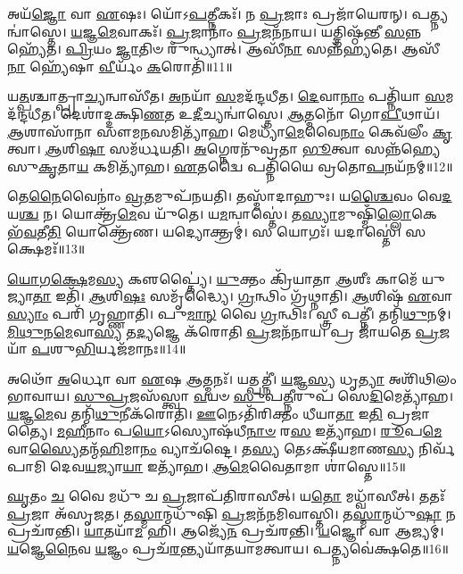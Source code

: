 𑌅𑌯᳴\-\ul{𑌜𑍍𑌞𑍋} 𑌵𑌾 \ul{𑌏}\-𑌷𑌃।
𑌯𑍋᳴𑌽\-\ul{𑌪}\-𑌤𑍍𑌨𑍀𑌕𑌃᳴।
𑌨 \ul{𑌪𑍍𑌰}\-𑌜𑌾𑌃 𑌪𑍍𑌰𑌜𑌾᳴𑌯𑍇𑌰𑌨𑍍।
𑌪𑌤𑍍𑌨𑍍𑌯𑌨𑍍𑌵𑌾॑𑌸𑍍𑌤𑍇।
\-\ul{𑌯}\-𑌜𑍍𑌞\-\ul{𑌮𑍇}\-𑌵𑌾𑌕𑌃᳴।
\-\ul{𑌪𑍍𑌰}\-𑌜𑌾𑌨𑌾𑌂॑ \ul{𑌪𑍍𑌰}\-𑌜𑌨᳴𑌨𑌾𑌯।
𑌯𑌤𑍍𑌤𑌿𑌷𑍍𑌠᳴𑌨𑍍𑌤𑍀 \ul{𑌸}\-𑌨𑍍𑌨𑌹𑍍𑌯𑍇᳴𑌤।
\-\ul{𑌪𑍍𑌰𑌿}\-𑌯𑌂 \ul{𑌜𑍍𑌞𑌾}\-𑌤𑌿𑍞 𑌰𑍁᳴𑌨𑍍𑌧𑍍𑌯𑌾𑌤𑍍।
𑌆𑌸𑍀᳴\-\ul{𑌨𑌾} 𑌸𑌨𑍍𑌨᳴𑌹𑍍𑌯𑌤𑍇।
𑌆𑌸𑍀᳴\-\ul{𑌨𑌾} 𑌹𑍍𑌯𑍇᳴𑌷𑌾 \ul{𑌵𑍀}\-𑌰𑍍𑌯𑌂᳴ \ul{𑌕}\-𑌰𑍋𑌤𑌿᳴॥11॥

𑌯\-\ul{𑌤𑍍𑌪}\-𑌶𑍍𑌚𑌾𑌤𑍍𑌪𑍍𑌰𑌾\-\ul{𑌚𑍍𑌯}\-𑌨𑍍𑌵𑌾𑌸𑍀᳴𑌤।
\-\ul{𑌅}\-𑌨𑌯𑌾᳴ \ul{𑌸}\-𑌮𑌦᳴𑌨𑍍𑌦𑌧𑍀𑌤।
\-\ul{𑌦𑍇}\-𑌵𑌾\-\ul{𑌨𑌾𑌂} 𑌪𑌤𑍍𑌨𑌿᳴𑌯𑌾 \ul{𑌸}\-𑌮𑌦᳴𑌨𑍍𑌦𑌧𑍀𑌤।
𑌦𑍇𑌶𑌾॑𑌦𑍍𑌦𑌕𑍍𑌷𑌿\-\ul{𑌣}\-𑌤 𑌉\-\ul{𑌦𑍀}\-𑌚𑍍𑌯𑌨𑍍𑌵𑌾॑𑌸𑍍𑌤𑍇।
\-\ul{𑌆}\-𑌤𑍍𑌮𑌨𑍋᳴ 𑌗𑍋\-\ul{𑌪𑍀}\-𑌥𑌾𑌯᳴।
\-\ul{𑌆}\-𑌶𑌾𑌸𑌾᳴𑌨𑌾 𑌸𑍗𑌮\-\ul{𑌨}\-𑌸𑌮𑌿𑌤𑍍𑌯𑌾᳴𑌹।
𑌮𑍇𑌧𑍍𑌯𑌾᳴\-\ul{𑌮𑍇}\-𑌵𑍈\-\ul{𑌨𑌾𑌂} 𑌕𑍇𑌵᳴𑌲𑍀𑌂 \ul{𑌕𑍃}\-𑌤𑍍𑌵𑌾।
\-\ul{𑌆}\-𑌶𑌿\-\ul{𑌷𑌾} 𑌸𑌮᳴𑌰𑍍𑌧𑌯𑌤𑌿।
\-\ul{𑌅}\-𑌗𑍍𑌨𑍇𑌰𑌨𑍁᳴\-𑌵𑍍𑌰𑌤𑌾 \ul{𑌭𑍂}\-𑌤𑍍𑌵𑌾 𑌸𑌨𑍍𑌨᳴𑌹𑍍𑌯𑍇 𑌸𑍁\-\ul{𑌕𑍃}\-𑌤𑌾\-\ul{𑌯} 𑌕𑌮𑌿𑌤𑍍𑌯𑌾᳴𑌹।
\-\ul{𑌏}\-𑌤𑌦𑍍𑌵𑍈 𑌪𑌤𑍍𑌨𑌿᳴𑌯𑍈 𑌵𑍍𑌰𑌤𑍋\-\ul{𑌪}\-𑌨𑌯᳴𑌨𑌮𑍍॥12॥

𑌤𑍇\-\ul{𑌨𑍈}\-𑌵𑍈𑌨𑌾𑌂॑ \ul{𑌵𑍍𑌰}\-𑌤𑌮𑍁𑌪᳴𑌨𑌯𑌤𑌿।
𑌤𑌸𑍍𑌮𑌾᳴𑌦𑌾𑌹𑍁𑌃।
𑌯\-\ul{𑌶𑍍𑌚𑍈}\-𑌵𑌂 𑌵𑍇\-\ul{𑌦} 𑌯\-\ul{𑌶𑍍𑌚} 𑌨।
𑌯𑍋𑌕𑍍𑌤𑍍𑌰᳴\-\ul{𑌮𑍇}\-𑌵 𑌯𑍁᳴𑌤𑍇।
𑌯\-\ul{𑌮}\-𑌨𑍍𑌵𑌾𑌸𑍍𑌤𑍇॑।
𑌤\-\ul{𑌸𑍍𑌯𑌾}\-𑌮𑍁𑌷𑍍𑌮𑌿𑌁᳴\-\ul{𑌲𑍍𑌲𑍋}\-𑌕𑍇 𑌭᳴\-\ul{𑌵}\-𑌤𑍀\-\ul{𑌤𑌿} 𑌯𑍋𑌕𑍍𑌤𑍍𑌰𑍇᳴𑌣।
𑌯𑌦𑍍𑌯𑍋𑌕𑍍𑌤𑍍𑌰𑌮𑍍॑।
𑌸 𑌯𑍋𑌗𑌃᳴।
𑌯𑌦𑌾𑌸𑍍𑌤𑍇॑।
𑌸 𑌕𑍍𑌷𑍇𑌮𑌃᳴॥13॥

\-\ul{𑌯𑍋}\-\-\ul{𑌗}\-\-\ul{𑌕𑍍𑌷𑍇}\-𑌮\-\ul{𑌸𑍍𑌯} 𑌕𑍢𑌪𑍍𑌤𑍍𑌯𑍈॑।
\-\ul{𑌯𑍁}\-𑌕𑍍𑌤𑌂 𑌕𑍍𑌰𑌿᳴𑌯𑌾𑌤𑌾 \ul{𑌆}\-𑌶𑍀𑌃 𑌕𑌾𑌮𑍇᳴ 𑌯𑍁𑌜𑍍𑌯𑌾\-\ul{𑌤𑌾} 𑌇𑌤𑌿᳴।
\-\ul{𑌆}\-𑌶𑌿\-\ul{𑌷𑌃} 𑌸𑌮𑍃᳴𑌦𑍍𑌧𑍍𑌯𑍈।
\-\ul{𑌗𑍍𑌰}\-𑌨𑍍𑌥𑌿𑌂 𑌗𑍍𑌰᳴𑌥𑍍𑌨𑌾𑌤𑌿।
\-\ul{𑌆}\-𑌶𑌿𑌷᳴ \ul{𑌏}\-𑌵𑌾\-\ul{𑌸𑍍𑌯𑌾𑌂} 𑌪𑌰𑌿᳴ 𑌗𑍃𑌹𑍍𑌣𑌾𑌤𑌿।
𑌪𑍁\-\ul{𑌮𑌾}\-\-\ul{𑌨𑍍} 𑌵𑍈 \ul{𑌗𑍍𑌰}\-𑌨𑍍𑌥𑌿𑌃।
𑌸𑍍𑌤𑍍𑌰𑍀 𑌪𑌤𑍍𑌨𑍀॑।
𑌤𑌨𑍍𑌮𑌿᳴\-\ul{𑌥𑍁}\-𑌨𑌮𑍍।
\-\ul{𑌮𑌿}\-\-\ul{𑌥𑍁}\-𑌨\-\ul{𑌮𑍇}\-𑌵𑌾\-\ul{𑌸𑍍𑌯} 𑌤\-\ul{𑌦𑍍𑌯}\-𑌜𑍍𑌞𑍇 𑌕᳴𑌰𑍋𑌤𑌿 \ul{𑌪𑍍𑌰}\-𑌜𑌨᳴𑌨𑌾𑌯।
𑌪𑍍𑌰 𑌜𑌾᳴𑌯𑌤𑍇 \ul{𑌪𑍍𑌰}\-𑌜𑌯𑌾᳴ \ul{𑌪}\-𑌶𑍁\-\ul{𑌭𑌿}\-𑌰𑍍𑌯𑌜᳴𑌮𑌾𑌨𑌃॥14॥

𑌅𑌥𑍋᳴ \ul{𑌅}\-𑌰𑍍𑌧𑍋 𑌵𑌾 \ul{𑌏}\-𑌷 \ul{𑌆}\-𑌤𑍍𑌮𑌨𑌃᳴।
𑌯𑌤𑍍𑌪𑌤𑍍𑌨𑍀॑।
\-\ul{𑌯}\-𑌜𑍍𑌞\-\ul{𑌸𑍍𑌯} 𑌧𑍃\-\ul{𑌤𑍍𑌯𑌾} 𑌅𑌶𑌿᳴𑌥𑌿𑌲𑌂 𑌭𑌾𑌵𑌾𑌯।
\-\ul{𑌸𑍁}\-\-\ul{𑌪𑍍𑌰}\-𑌜𑌸᳴𑌸𑍍𑌤𑍍𑌵𑌾 \ul{𑌵}\-𑌯𑍞 \ul{𑌸𑍁}\-𑌪\-\ul{𑌤𑍍𑌨𑍀}\-𑌰𑍁𑌪᳴ 𑌸𑍇\-\ul{𑌦𑌿}\-𑌮𑍇𑌤𑍍𑌯𑌾᳴𑌹।
\-\ul{𑌯}\-𑌜𑍍𑌞\-\ul{𑌮𑍇}\-𑌵 𑌤𑌨𑍍𑌮𑌿᳴\-\ul{𑌥𑍁}\-𑌨𑍀𑌕᳴𑌰𑍋𑌤𑌿।
\-\ul{𑌊}\-𑌨𑍇𑌽𑌤𑌿᳴𑌰𑌿𑌕𑍍𑌤𑌂 𑌧𑍀𑌯𑌾\-\ul{𑌤𑌾} 𑌇\-\ul{𑌤𑌿} 𑌪𑍍𑌰𑌜𑌾॑𑌤𑍍𑌯𑍈।
\-\ul{𑌮}\-\-\ul{𑌹𑍀}\-𑌨𑌾𑌂 𑌪\-\ul{𑌯𑍋}\-\-𑌽𑌸𑍍𑌯𑍋𑌷᳴𑌧𑍀\-\ul{𑌨𑌾}\-\-\ul{𑍞} 𑌰\-\ul{𑌸} 𑌇𑌤𑍍𑌯𑌾᳴𑌹।
\-\ul{𑌰𑍂}\-𑌪\-\ul{𑌮𑍇}\-𑌵𑌾\-\ul{𑌸𑍍𑌯𑍈}\-𑌤𑌨𑍍𑌮᳴\-\ul{𑌹𑌿}\-𑌮𑌾\-\ul{𑌨𑌂} 𑌵𑍍𑌯𑌾𑌚᳴𑌷𑍍𑌟𑍇।
𑌤\-\ul{𑌸𑍍𑌯} 𑌤𑍇𑌽𑌕𑍍𑌷𑍀᳴𑌯𑌮𑌾𑌣\-\ul{𑌸𑍍𑌯} 𑌨𑌿𑌰𑍍𑌵᳴𑌪𑌾𑌮𑌿 𑌦𑍇𑌵\-\ul{𑌯}\-𑌜𑍍𑌯𑌾\-\ul{𑌯𑌾} 𑌇𑌤𑍍𑌯𑌾᳴𑌹।
\-\ul{𑌆}\-\-\-\ul{𑌮𑍇}\-𑌵𑍈𑌤𑌾𑌮𑌾 𑌶𑌾॑𑌸𑍍𑌤𑍇॥15॥\anuvakamend[\-\ul{𑌕}\-𑌰𑍋𑌤𑌿᳴ 𑌵𑍍𑌰𑌤𑍋\-\ul{𑌪}\-𑌨𑌯᳴\-\ul{𑌨𑌂} 𑌕𑍍𑌷𑍇\-\ul{𑌮𑍋} 𑌯𑌜᳴𑌮𑌾𑌨𑌃 𑌶𑌾𑌸𑍍𑌤𑍇]

\-\ul{𑌘𑍃}\-𑌤𑌂 \ul{𑌚} 𑌵𑍈 𑌮𑌧𑍁᳴ 𑌚 \ul{𑌪𑍍𑌰}\-𑌜𑌾𑌪᳴𑌤𑌿𑌰𑌾𑌸𑍀𑌤𑍍।
𑌯\-\ul{𑌤𑍋} 𑌮𑌧𑍍𑌵𑌾᳴𑌸𑍀𑌤𑍍।
𑌤𑌤𑌃᳴ \ul{𑌪𑍍𑌰}\-𑌜𑌾 𑌅᳴\-𑌸𑍃𑌜𑌤।
𑌤\-\ul{𑌸𑍍𑌮𑌾}\-𑌨𑍍𑌮𑌧𑍁᳴𑌷𑌿 \ul{𑌪𑍍𑌰}\-𑌜𑌨᳴𑌨𑌮𑌿𑌵𑌾𑌸𑍍𑌤𑌿।
𑌤\-\ul{𑌸𑍍𑌮𑌾}\-𑌨𑍍𑌮𑌧𑍁᳴\-\ul{𑌷𑌾} 𑌨 𑌪𑍍𑌰𑌚᳴𑌰𑌨𑍍𑌤𑌿।
\-\ul{𑌯𑌾}\-𑌤𑌯𑌾᳴\-\ul{𑌮} 𑌹𑌿।
𑌆𑌜𑍍𑌯𑍇᳴\-\ul{𑌨} 𑌪𑍍𑌰𑌚᳴𑌰𑌨𑍍𑌤𑌿।
\-\ul{𑌯}\-𑌜𑍍𑌞𑍋 𑌵𑌾 𑌆𑌜𑍍𑌯𑌮𑍍॑।
\-\ul{𑌯}\-𑌜𑍍𑌞𑍇\-\ul{𑌨𑍈}\-𑌵 \ul{𑌯}\-𑌜𑍍𑌞𑌂 𑌪𑍍𑌰𑌚᳴\-\ul{𑌰}\-𑌨𑍍𑌤𑍍𑌯𑌯𑌾᳴𑌤𑌯𑌾𑌮𑌤𑍍𑌵𑌾𑌯।
𑌪𑌤𑍍𑌨𑍍𑌯𑌵𑍇॑𑌕𑍍𑌷𑌤𑍇॥16॥


